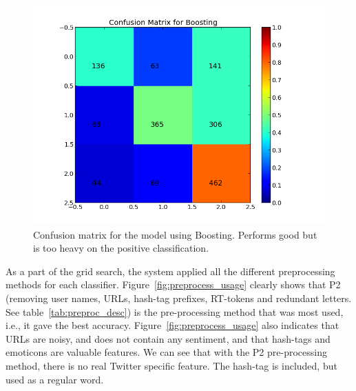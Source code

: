 \begin{minipage}[!htb]{\linewidth}
     \begin{minipage}{0.45\linewidth}
	     \begin{figure}[H]
	          \includegraphics[width=\linewidth]{../img/plots/grid/confusion_matrix_Boosting.png}
	      \caption[Plot showing the confusion matrix for Boosting]{Confusion matrix for the model using Boosting. Performs good but is too heavy on the positive classification.}
	      \label{fig:confmat_boosting}
	     \end{figure}
     \end{minipage}
\end{minipage}



As a part of the grid search, the system applied all the different preprocessing methods for each classifier. Figure~\ref{fig:preprocess_usage} clearly shows that P2 (removing user names, URLs, hash-tag prefixes, RT-tokens and redundant letters. See table~\ref{tab:preproc_desc}) is the pre-processing method that was most used, i.e., it gave the best accuracy. Figure~\ref{fig:preprocess_usage} also indicates that URLs are noisy, and does not contain any sentiment, and that hash-tags and emoticons are valuable features. We can see that with the P2 pre-processing method, there is no real Twitter specific feature. The hash-tag is included, but used as a regular word.

